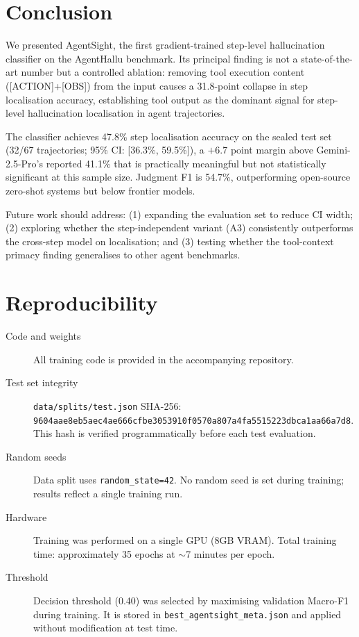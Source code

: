 \documentclass[11pt]{article}
\begin{document}
\section{Conclusion}

We presented AgentSight, the first gradient-trained step-level hallucination classifier on the AgentHallu benchmark. Its principal finding is not a state-of-the-art number but a controlled ablation: removing tool execution content ([ACTION]+[OBS]) from the input causes a 31.8-point collapse in step localisation accuracy, establishing tool output as the dominant signal for step-level hallucination localisation in agent trajectories.

The classifier achieves 47.8\% step localisation accuracy on the sealed test set (32/67 trajectories; 95\% CI: [36.3\%, 59.5\%]), a $+$6.7 point margin above Gemini-2.5-Pro's reported 41.1\% that is practically meaningful but not statistically significant at this sample size. Judgment F1 is 54.7\%, outperforming open-source zero-shot systems but below frontier models.

Future work should address: (1) expanding the evaluation set to reduce CI width; (2) exploring whether the step-independent variant (A3) consistently outperforms the cross-step model on localisation; and (3) testing whether the tool-context primacy finding generalises to other agent benchmarks.




\appendix
\section{Reproducibility}

\begin{description}
  \item[Code and weights] All training code is provided in the accompanying repository.
  \item[Test set integrity] \texttt{data/splits/test.json} SHA-256: \texttt{9604aae8eb5aec4ae666cfbe3053910f0570a807a4fa5515223dbca1aa66a7d8}. This hash is verified programmatically before each test evaluation.
  \item[Random seeds] Data split uses \texttt{random\_state=42}. No random seed is set during training; results reflect a single training run.
  \item[Hardware] Training was performed on a single GPU (8GB VRAM). Total training time: approximately 35 epochs at $\sim$7 minutes per epoch.
  \item[Threshold] Decision threshold (0.40) was selected by maximising validation Macro-F1 during training. It is stored in \texttt{best\_agentsight\_meta.json} and applied without modification at test time.
\end{description}
\end{document}
